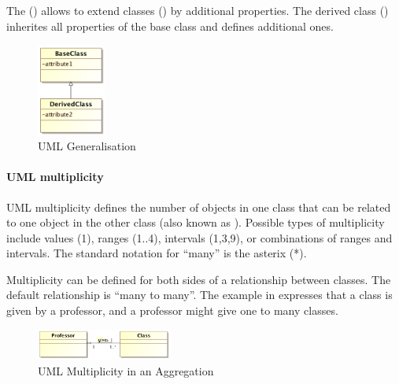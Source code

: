 The  () allows to extend classes () by additional properties. The derived class () inherites all properties of the base class and defines additional ones.
\begin{figure}[h]
\centering
\includegraphics[width=0.2\textwidth]{images/uml/umlGeneralisation.png}
\caption{UML Generalisation}
\label{fig:umlGeneralisation}
\end{figure}

\paragraph{UML multiplicity}
UML multiplicity defines the number of objects in one class that can be related to one object in the other class (also known as ). Possible types of multiplicity include values (1), ranges (1$..$4), intervals (1,3,9), or combinations of ranges and intervals. The standard notation for ``many'' is the asterix (*). 

Multiplicity can be defined for both sides of a relationship between classes. The default relationship is ``many to many''. 
The example in  expresses that a class is given by a professor, and a professor might give one to many classes.
\begin{figure}[h]
\centering
\includegraphics[width=0.4\textwidth]{images/uml/umlMultiplicity.png}
\caption{UML Multiplicity in an Aggregation}
\label{fig:umlMulti}
\end{figure}

